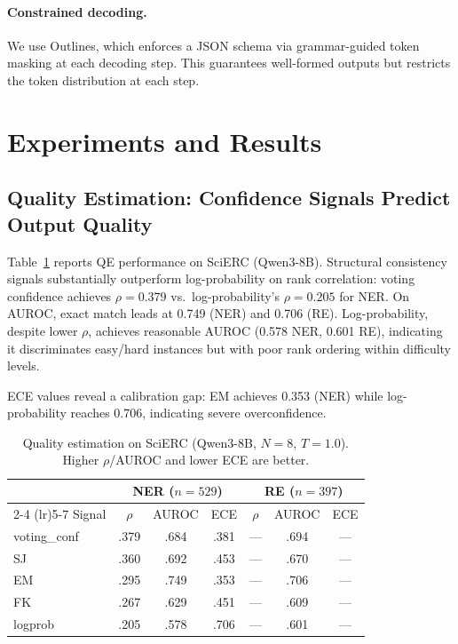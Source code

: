 \documentclass[11pt,a4paper]{article}
\begin{document}
\paragraph{Constrained decoding.} We use Outlines, which enforces a JSON schema via grammar-guided token masking at each decoding step. This guarantees well-formed outputs but restricts the token distribution at each step.

\section{Experiments and Results}

\subsection{Quality Estimation: Confidence Signals Predict Output Quality}
\label{sec:qe}

Table~\ref{tab:qe-scierc} reports QE performance on SciERC (Qwen3-8B). Structural consistency signals substantially outperform log-probability on rank correlation: voting confidence achieves $\rho{=}0.379$ vs.\ log-probability's $\rho{=}0.205$ for NER. On AUROC, exact match leads at 0.749 (NER) and 0.706 (RE). Log-probability, despite lower $\rho$, achieves reasonable AUROC (0.578 NER, 0.601 RE), indicating it discriminates easy/hard instances but with poor rank ordering within difficulty levels.

ECE values reveal a calibration gap: EM achieves 0.353 (NER) while log-probability reaches 0.706, indicating severe overconfidence.

\begin{table}[t]
\centering
\small
\caption{Quality estimation on SciERC (Qwen3-8B, $N{=}8$, $T{=}1.0$). Higher $\rho$/AUROC and lower ECE are better.}
\label{tab:qe-scierc}
\begin{tabular}{lcccccc}
\toprule
& \multicolumn{3}{c}{\textbf{NER} ($n{=}529$)} & \multicolumn{3}{c}{\textbf{RE} ($n{=}397$)} \\
\cmidrule(lr){2-4} \cmidrule(lr){5-7}
Signal & $\rho$ & AUROC & ECE & $\rho$ & AUROC & ECE \\
\midrule
voting\_conf & .379 & .684 & .381 & --- & .694 & --- \\
SJ & .360 & .692 & .453 & --- & .670 & --- \\
EM & .295 & .749 & .353 & --- & .706 & --- \\
FK & .267 & .629 & .451 & --- & .609 & --- \\
logprob & .205 & .578 & .706 & --- & .601 & --- \\
\bottomrule
\end{tabular}
\end{table}
\end{document}
